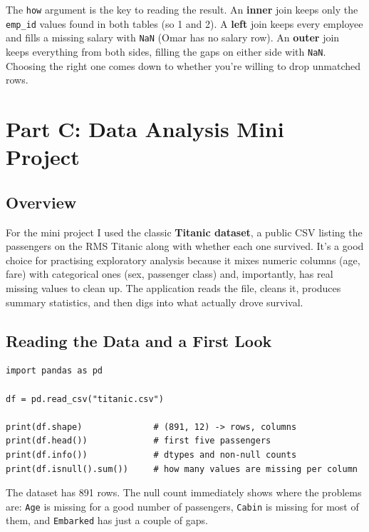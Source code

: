\documentclass[11pt,a4paper]{article}
\begin{document}
The \texttt{how} argument is the key to reading the result. An \textbf{inner} join keeps only the \texttt{emp\_id} values found in both tables (so 1 and 2). A \textbf{left} join keeps every employee and fills a missing salary with \texttt{NaN} (Omar has no salary row). An \textbf{outer} join keeps everything from both sides, filling the gaps on either side with \texttt{NaN}. Choosing the right one comes down to whether you're willing to drop unmatched rows.

\section*{Part C: Data Analysis Mini Project}

\subsection*{Overview}
For the mini project I used the classic \textbf{Titanic dataset}, a public CSV listing the passengers on the RMS Titanic along with whether each one survived. It's a good choice for practising exploratory analysis because it mixes numeric columns (age, fare) with categorical ones (sex, passenger class) and, importantly, has real missing values to clean up. The application reads the file, cleans it, produces summary statistics, and then digs into what actually drove survival.

\subsection*{Reading the Data and a First Look}
\begin{lstlisting}[style=py, caption={Loading the dataset and inspecting it.}]
import pandas as pd

df = pd.read_csv("titanic.csv")

print(df.shape)              # (891, 12) -> rows, columns
print(df.head())             # first five passengers
print(df.info())             # dtypes and non-null counts
print(df.isnull().sum())     # how many values are missing per column
\end{lstlisting}

The dataset has 891 rows. The null count immediately shows where the problems are: \texttt{Age} is missing for a good number of passengers, \texttt{Cabin} is missing for most of them, and \texttt{Embarked} has just a couple of gaps.
\end{document}
